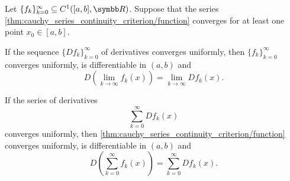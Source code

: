 \begin{corollary}\label{thm:derivative_limit_exchange}\cite[theorem 7.17]{Rudin1991}
  Let \( \{ f_k \}_{k=0}^\infty \subseteq C^1([a, b], \R) \). Suppose that the series \cref{thm:cauchy_series_continuity_criterion/function} converges for at least one point \( x_0 \in [a, b] \).

  \begin{thmenum}
     If the sequence \( \{ D f_k \}_{k=0}^\infty \) of derivatives converges uniformly, then \( \{ f_k \}_{k=0}^\infty \) converges uniformly, is differentiable in \( (a, b) \) and
    \begin{equation*}
      D\left(\lim_{k \to \infty} f_k(x) \right) = \lim_{k \to \infty} D f_k(x).
    \end{equation*}

     If the series of derivatives
    \begin{equation}\label{thm:derivative_limit_exchange/derivative_series}
      \sum_{k=0}^\infty D f_k(x)
    \end{equation}
    converges uniformly, then \cref{thm:cauchy_series_continuity_criterion/function} converges uniformly, is differentiable in \( (a, b) \) and
    \begin{equation*}
      D\left(\sum_{k=0}^\infty f_k(x)\right) = \sum_{k=0}^\infty D f_k(x).
    \end{equation*}
  \end{thmenum}
\end{corollary}
